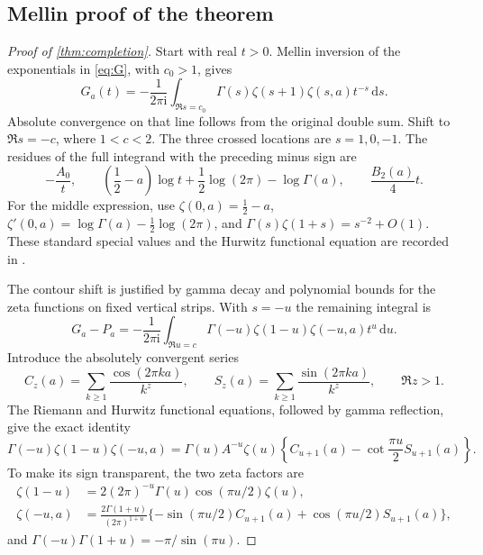 \documentclass[11pt,a4paper]{article}
\numberwithin{equation}{section}
\theoremstyle{definition}
\theoremstyle{remark}
\newcommand{\ii}{\mathrm i}
\newcommand{\dd}{\,\mathrm d}
\begin{document}
\subsection{Mellin proof of the theorem}
\begin{proof}[Proof of \cref{thm:completion}]
Start with real $t>0$. Mellin inversion of the exponentials in
\eqref{eq:G}, with $c_0>1$, gives
\begin{equation}
 G_a(t)=-\frac1{2\pi\ii}\int_{\Re s=c_0}
          \Gamma(s)\zeta(s+1)\zeta(s,a)t^{-s}\dd s.
 \label{eq:mellinG}
\end{equation}
Absolute convergence on that line follows from the original double
sum. Shift to $\Re s=-c$, where $1<c<2$. The three crossed locations are
$s=1,0,-1$. The residues of the full integrand with the preceding minus
sign are
\[
 -\frac{A_0}{t},\qquad
 \left(\frac12-a\right)\log t+\frac12\log(2\pi)-\log\Gamma(a),
 \qquad \frac{B_2(a)}4t.
\]
For the middle expression, use $\zeta(0,a)=\frac12-a$,
$\zeta'(0,a)=\log\Gamma(a)-\frac12\log(2\pi)$, and
$\Gamma(s)\zeta(1+s)=s^{-2}+O(1)$. These standard special values and the
Hurwitz functional equation are recorded in \cite{dlmfzeta}.

The contour shift is justified by gamma decay and polynomial bounds
for the zeta functions on fixed vertical strips. With $s=-u$ the
remaining integral is
\begin{equation}
 G_a-P_a=-\frac1{2\pi\ii}\int_{\Re u=c}
          \Gamma(-u)\zeta(1-u)\zeta(-u,a)t^u\dd u.
 \label{eq:shiftedmellin}
\end{equation}
Introduce the absolutely convergent series
\begin{equation}
 C_z(a)=\sum_{k\geq1}\frac{\cos(2\pi ka)}{k^z},\qquad
 S_z(a)=\sum_{k\geq1}\frac{\sin(2\pi ka)}{k^z},\qquad \Re z>1.
 \label{eq:CS}
\end{equation}
The Riemann and Hurwitz functional equations, followed by gamma
reflection, give the exact identity
\begin{equation}
 \Gamma(-u)\zeta(1-u)\zeta(-u,a)
 =\Gamma(u)A^{-u}\zeta(u)
   \left\{C_{u+1}(a)-\cot\frac{\pi u}{2}S_{u+1}(a)\right\}.
 \label{eq:functionaleq}
\end{equation}
To make its sign transparent, the two zeta factors are
\begin{align*}
 \zeta(1-u)&=2(2\pi)^{-u}\Gamma(u)\cos(\pi u/2)\zeta(u),\\
 \zeta(-u,a)&=\frac{2\Gamma(1+u)}{(2\pi)^{1+u}}
  \{-\sin(\pi u/2)C_{u+1}(a)+\cos(\pi u/2)S_{u+1}(a)\},
\end{align*}
and $\Gamma(-u)\Gamma(1+u)=-\pi/\sin(\pi u)$.


\end{proof}
\end{document}
